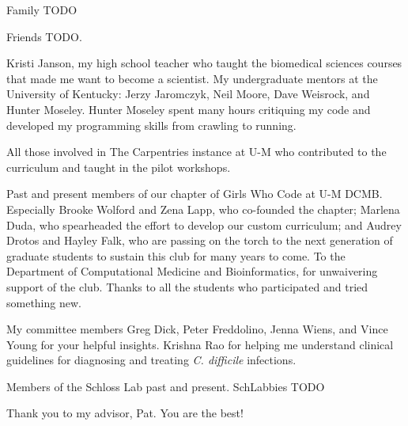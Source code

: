   Family TODO

  Friends TODO. 
  
  Kristi Janson, my high school teacher who taught the biomedical sciences
  courses that made me want to become a scientist.
  My undergraduate mentors at the University of Kentucky:
  Jerzy Jaromczyk, Neil Moore, Dave Weisrock, and Hunter Moseley.
  Hunter Moseley spent many hours critiquing my code and developed my
  programming skills from crawling to running.

  All those involved in The Carpentries instance at U-M who contributed to the
  curriculum and taught in the pilot workshops.

  Past and present members of our chapter of Girls Who Code at U-M DCMB.
  Especially Brooke Wolford and Zena Lapp, who co-founded the chapter;
  Marlena Duda, who spearheaded the effort to develop our custom curriculum; and
  Audrey Drotos and Hayley Falk, who are passing on the torch to the next
  generation of graduate students to sustain this club for many years to come.
  To the Department of Computational Medicine and Bioinformatics, for unwaivering
  support of the club.
  Thanks to all the students who participated and tried something new.

  My committee members Greg Dick, Peter Freddolino, Jenna Wiens, and
  Vince Young for your helpful insights.
  Krishna Rao for helping me understand clinical guidelines for diagnosing
  and treating \textit{C. difficile} infections.

  Members of the Schloss Lab past and present. SchLabbies TODO

  Thank you to my advisor, Pat. You are the best!
  